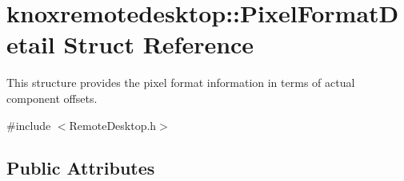 \hypertarget{structknoxremotedesktop_1_1PixelFormatDetail}{\section{knoxremotedesktop\-:\-:\-Pixel\-Format\-Detail \-Struct \-Reference}
\label{structknoxremotedesktop_1_1PixelFormatDetail}
}


\-This structure provides the pixel format information in terms of actual component offsets.  




{\ttfamily \#include $<$\-Remote\-Desktop.\-h$>$}

\subsection*{\-Public \-Attributes}

